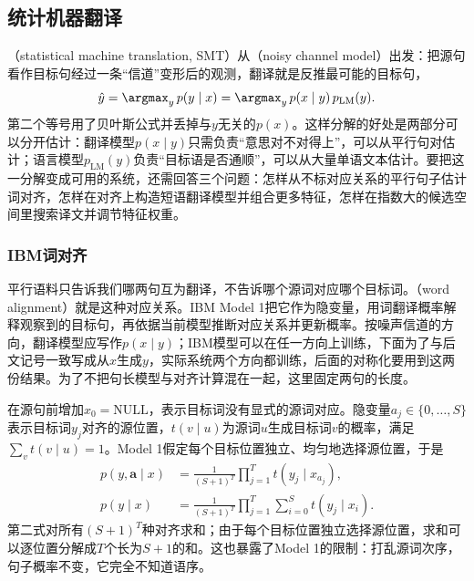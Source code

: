 \subsection{统计机器翻译}
\label{sec:nlp-generation-smt}

（statistical machine translation, SMT）从（noisy channel model）出发：把源句看作目标句经过一条“信道”变形后的观测，翻译就是反推最可能的目标句，
\begin{equation}
  \hat y=\argmax_{y}\,p(y\mid x)=\argmax_{y}\,p(x\mid y)\,p_{\mathrm{LM}}(y).
  \label{eq:nlp-generation-noisy-channel}
\end{equation}
第二个等号用了贝叶斯公式并丢掉与$y$无关的$p(x)$。这样分解的好处是两部分可以分开估计：翻译模型$p(x\mid y)$只需负责“意思对不对得上”，可以从平行句对估计；语言模型$p_{\mathrm{LM}}(y)$负责“目标语是否通顺”，可以从大量单语文本估计。要把这一分解变成可用的系统，还需回答三个问题：怎样从不标对应关系的平行句子估计词对齐，怎样在对齐上构造短语翻译模型并组合更多特征，怎样在指数大的候选空间里搜索译文并调节特征权重。

\subsubsection{IBM词对齐}
\label{sec:nlp-generation-ibm}

平行语料只告诉我们哪两句互为翻译，不告诉哪个源词对应哪个目标词。（word alignment）就是这种对应关系。IBM Model 1把它作为隐变量，用词翻译概率解释观察到的目标句，再依据当前模型推断对应关系并更新概率。按噪声信道的方向，翻译模型应写作$p(x\mid y)$；IBM模型可以在任一方向上训练，下面为了与后文记号一致写成从$x$生成$y$，实际系统两个方向都训练，后面的对称化要用到这两份结果。为了不把句长模型与对齐计算混在一起，这里固定两句的长度。

在源句前增加$x_0=\mathrm{NULL}$，表示目标词没有显式的源词对应。隐变量$a_j\in\{0,\ldots,S\}$表示目标词$y_j$对齐的源位置，$t(v\mid u)$为源词$u$生成目标词$v$的概率，满足$\sum_v t(v\mid u)=1$。Model 1假定每个目标位置独立、均匀地选择源位置，于是
\begin{align}
  p(y,\bm{a}\mid x)
    &=\frac{1}{(S+1)^T}\prod_{j=1}^{T}t(y_j\mid x_{a_j}),\\
  p(y\mid x)
    &=\frac{1}{(S+1)^T}\prod_{j=1}^{T}
       \sum_{i=0}^{S}t(y_j\mid x_i).
  \label{eq:nlp-generation-ibm-likelihood}
\end{align}
第二式对所有$(S+1)^T$种对齐求和；由于每个目标位置独立选择源位置，求和可以逐位置分解成$T$个长为$S+1$的和。这也暴露了Model 1的限制：打乱源词次序，句子概率不变，它完全不知道语序。

